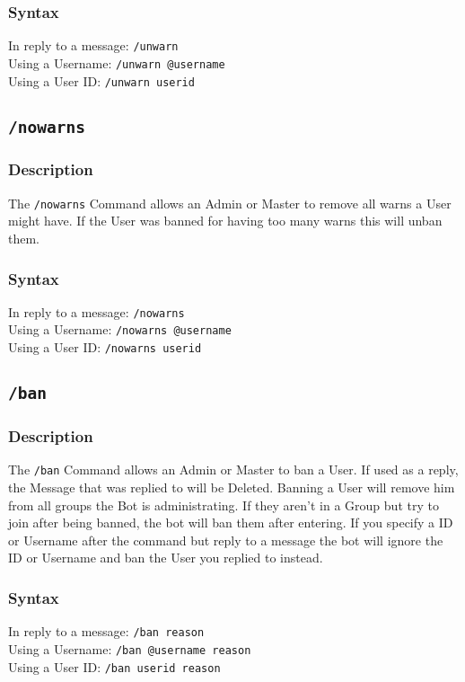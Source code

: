 \documentclass[a4paper]{article}
\begin{document}
        \subsubsection*{Syntax}
            In reply to a message: \texttt{/unwarn}\\
            Using a Username: \texttt{/unwarn @username}\\
            Using a User ID: \texttt{/unwarn userid}

    \subsection{\texttt{/nowarns}}
        \subsubsection*{Description}
            The \texttt{/nowarns} Command allows an Admin or Master to remove all warns a User might have. If the User was banned for having too many warns this will unban them.

        \subsubsection*{Syntax}
            In reply to a message: \texttt{/nowarns}\\
            Using a Username: \texttt{/nowarns @username}\\
            Using a User ID: \texttt{/nowarns userid}


    \subsection{\texttt{/ban}}
        \subsubsection*{Description}
            The \texttt{/ban} Command allows an Admin or Master to ban a User. If used as a reply, the Message that was replied to will be Deleted. Banning a User will remove him from all groups the Bot is administrating. If they aren't in a Group but try to join after being banned, the bot will ban them after entering. If you specify a ID or Username after the command but reply to a message the bot will ignore the ID or Username and ban the User you replied to instead.

        \subsubsection*{Syntax}
            In reply to a message: \texttt{/ban reason}\\
            Using a Username: \texttt{/ban @username reason}\\
            Using a User ID: \texttt{/ban userid reason}
\end{document}
